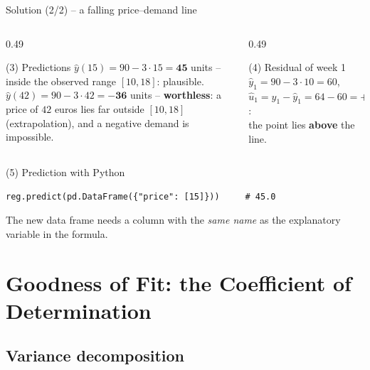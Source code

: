\documentclass[aspectratio=169,11pt]{beamer}
\begin{document}
\begin{frame}[fragile]{Solution (2/2) -- a falling price--demand line}
  \lstset{aboveskip=2pt,belowskip=2pt}
  \vspace{-6pt}
  \begin{columns}[T]
    \begin{column}{0.49\textwidth}
      \begin{exampleblock}{(3) Predictions}
        $\hat y(15)=90-3\cdot15=\mathbf{45}$ units -- inside the observed range
        $[10,18]$: plausible.\\[4pt]
        $\hat y(42)=90-3\cdot42=\mathbf{-36}$ units -- \textbf{worthless}:
        a price of $42$ euros lies far outside $[10,18]$ (extrapolation), and a negative
        demand is impossible.
      \end{exampleblock}
    \end{column}
    \begin{column}{0.49\textwidth}
      \begin{exampleblock}{(4) Residual of week 1}
        $\hat y_1=90-3\cdot10=60$, \quad
        $\hat u_1=y_1-\hat y_1=64-60=\mathbf{+4}$:\\
        the point lies \textbf{above} the line.
      \end{exampleblock}
    \end{column}
  \end{columns}
  \vspace{-4pt}
  \begin{block}{(5) Prediction with Python}
\begin{lstlisting}
reg.predict(pd.DataFrame({"price": [15]}))     # 45.0
\end{lstlisting}
    The new data frame needs a column with the \emph{same name} as the
    explanatory variable in the formula.
  \end{block}
\end{frame}

\section[Fit]{Goodness of Fit: the Coefficient of Determination}

\subsection{Variance decomposition}
\end{document}
